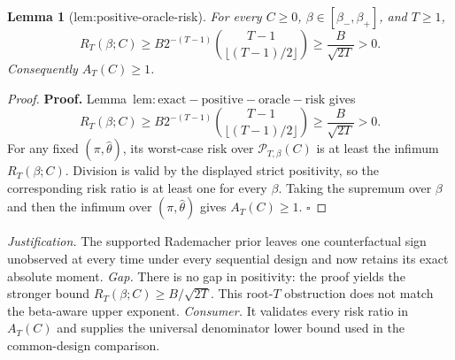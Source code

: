 \documentclass{article}
\newtheorem{lemma}{Lemma}
\begin{document}
\begin{lemma}[lem:positive-oracle-risk]\label{lem:positive-oracle-risk}
For every \(C\ge0\), \(\beta\in[\beta_-,\beta_+]\), and \(T\ge1\), \[R_T(\beta;C)\ge B2^{-(T-1)}\binom{T-1}{\lfloor(T-1)/2\rfloor}\ge\frac{B}{\sqrt{2T}}>0.\] Consequently \(A_T(C)\ge1\).
\end{lemma}
\begin{proof}
\textbf{Proof.} Lemma~\(\mathrm{lem:exact-positive-oracle-risk}\) gives
\[
R_T(\beta;C)\ge B2^{-(T-1)}\binom{T-1}{\lfloor(T-1)/2\rfloor}\ge\frac{B}{\sqrt{2T}}>0.
\]
For any fixed \((\pi,\widehat\theta)\), its worst-case risk over \(\mathcal P_{T,\beta}(C)\) is at least the infimum \(R_T(\beta;C)\). Division is valid by the displayed strict positivity, so the corresponding risk ratio is at least one for every \(\beta\). Taking the supremum over \(\beta\) and then the infimum over \((\pi,\widehat\theta)\) gives \(A_T(C)\ge1\). \(\square\)
\end{proof}
\par\smallskip\noindent \textit{Justification.} The supported Rademacher prior leaves one counterfactual sign unobserved at every time under every sequential design and now retains its exact absolute moment. \textit{Gap.} There is no gap in positivity: the proof yields the stronger bound \(R_T(\beta;C)\ge B/\sqrt{2T}\). This root-\(T\) obstruction does not match the beta-aware upper exponent. \textit{Consumer.} It validates every risk ratio in \(A_T(C)\) and supplies the universal denominator lower bound used in the common-design comparison.
\end{document}

